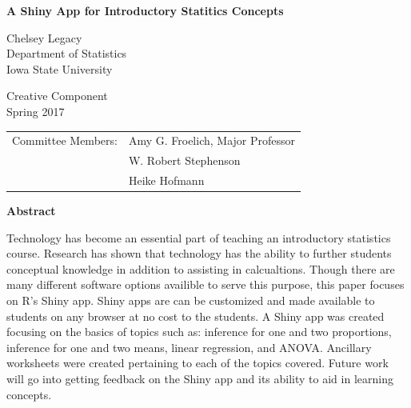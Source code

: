 \documentclass[11pt]{book}
\begin{document}
\begin{titlepage}
    \begin{center}
                
        \Large
        \textbf{A Shiny App for Introductory Statitics Concepts}
        
      
        \vspace{1cm}
       
        
        \Large
        Chelsey Legacy \\
        \vspace{0.25cm}
        Department of Statistics\\
          \vspace{0.25cm}
        Iowa State University\\
       
        
        \vspace{1cm}
               
           Creative Component\\
             \vspace{0.25cm}
           Spring 2017
           
           \vspace{2cm}
         
				\begin{center}
				\begin{tabular}{rl}
				Committee Members: & Amy G. Froelich, Major Professor\\
				 & W. Robert Stephenson \\
				 & Heike Hofmann\\
				\end{tabular}
				\end{center}
           
    \end{center}
\end{titlepage}







\begin{center}
\textbf{Abstract}
\end{center}
Technology has become an essential part of teaching an introductory statistics course. Research has shown that technology has the ability to further students conceptual knowledge in addition to assisting in calcualtions. Though there are many different software options availible to serve this purpose, this paper focuses on R's Shiny app. Shiny apps are can be customized and made available to students on any browser at no cost to the students. A Shiny app was created focusing on the basics of topics such as: inference for one and two proportions, inference for one and two means, linear regression, and ANOVA. Ancillary worksheets were created pertaining to each of the topics covered. Future work will go into getting feedback on the Shiny app and its ability to aid in learning concepts.
\end{document}
